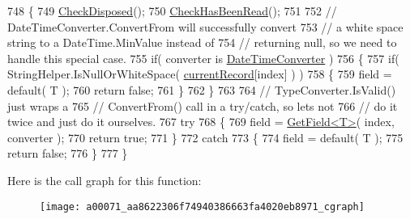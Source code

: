 \begin{DoxyCode}
748         \{
749             \hyperlink{a00071_a6fa45a46ed1322dc1872ca2321b5edbc}{CheckDisposed}();
750             \hyperlink{a00071_a2d9249171ed1568e45d152766d364c31}{CheckHasBeenRead}();
751 
752             \textcolor{comment}{// DateTimeConverter.ConvertFrom will successfully convert}
753             \textcolor{comment}{// a white space string to a DateTime.MinValue instead of}
754             \textcolor{comment}{// returning null, so we need to handle this special case.}
755             \textcolor{keywordflow}{if}( converter is \hyperlink{a00078}{DateTimeConverter} )
756             \{
757                 \textcolor{keywordflow}{if}( StringHelper.IsNullOrWhiteSpace( \hyperlink{a00071_ab2bfef15784add66e441c9d3a0d73751}{currentRecord}[index] ) )
758                 \{
759                     field = \textcolor{keywordflow}{default}( T );
760                     \textcolor{keywordflow}{return} \textcolor{keyword}{false};
761                 \}
762             \}
763 
764             \textcolor{comment}{// TypeConverter.IsValid() just wraps a}
765             \textcolor{comment}{// ConvertFrom() call in a try/catch, so lets not}
766             \textcolor{comment}{// do it twice and just do it ourselves.}
767             \textcolor{keywordflow}{try}
768             \{
769                 field = \hyperlink{a00071_a6a43cfaf39caea93ecd87e506be7b404}{GetField<T>}( index, converter );
770                 \textcolor{keywordflow}{return} \textcolor{keyword}{true};
771             \}
772             \textcolor{keywordflow}{catch}
773             \{
774                 field = \textcolor{keywordflow}{default}( T );
775                 \textcolor{keywordflow}{return} \textcolor{keyword}{false};
776             \}
777         \}
\end{DoxyCode}


Here is the call graph for this function\-:
\nopagebreak
\begin{figure}[H]
\begin{center}
\leavevmode
\texttt{[image: a00071\_aa8622306f74940386663fa4020eb8971\_cgraph]}
\end{center}
\end{figure}


